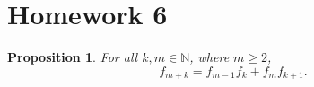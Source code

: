 \documentclass[12pt]{article}
\newtheorem{proposition}{Proposition}
\newcommand{\setpropnum}[1]{\renewcommand{\theproposition}{#1}}
\begin{document}
\pagestyle{fancy}
\fancyhf{} %
\setlength{\headheight}{41.54604pt}
\addtolength{\topmargin}{-27.04604pt}

\section*{Homework 6}

\setpropnum{4.30}
\begin{proposition}
  For all $k, m \in \mathbb{N}$, where $m \geq 2$,
  \[
    f_{m+k} = f_{m-1}f_k + f_m f_{k+1}.
  \]
\end{proposition}
\end{document}
